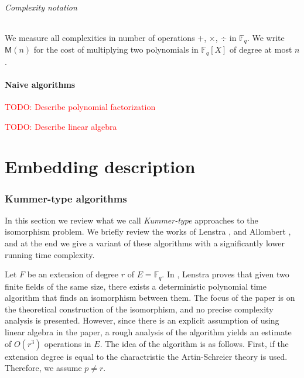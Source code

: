 \documentclass[12pt]{article}
\theoremstyle{plain}
\theoremstyle{definition}
\newcommand{\todo}[1]{\textcolor{red}{TODO: #1}}
\def\F{\ensuremath{\mathbb{F}}}
\def\MM{\ensuremath{\mathsf{M}}}
\newcounter{algorithm}
\begin{document}
\paragraph{Complexity notation} We measure all complexities in number
of operations $+$, $\times$, $\div$ in $\F_q$. We write $\MM(n)$ for
the cost of multiplying two polynomials in $\F_q[X]$ of degree at most
$n$.


\subsection{Naive algorithms}

\todo{Describe polynomial factorization}

\todo{Describe linear algebra}



\part{Embedding description}


\section{Kummer-type algorithms}

In this section we review what we call \textit{Kummer-type} approaches to the isomorphism problem. 
We briefly review the works of Lenstra \cite{LenstraJr91}, and Allombert \cite{Allombert02}, and at 
the end we give a variant of these algorithms with a significantly lower running time complexity.

Let $F$ be an extension of degree $r$ of $E = \F_q$. In \cite{LenstraJr91}, Lenstra proves that 
given two finite fields of the same size, there exists a deterministic polynomial time algorithm 
that finds an isomorphism between them. The focus of the paper is on the theoretical construction 
of the isomorphism, and no precise complexity analysis is presented. However, since there is an 
explicit assumption of using linear algebra in the paper, a rough analysis of the algorithm yields 
an estimate of $O(r^3)$ operations in $E$. The idea of the algorithm is as follows. First, if 
the extension degree is equal to the charactristic the Artin-Schreier theory is used. Therefore, we 
assume $p \ne r$.
\end{document}
